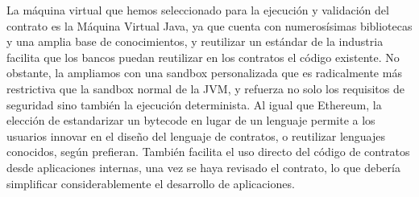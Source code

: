\documentclass{article}
\begin{document}
La máquina virtual que hemos seleccionado para la ejecución y validación del contrato es la Máquina Virtual Java\cite{JVM}, ya que cuenta con numerosísimas bibliotecas y una amplia base de conocimientos, y reutilizar un estándar de la industria facilita que los bancos puedan reutilizar en los contratos el código existente. No obstante, la ampliamos con una sandbox personalizada que es radicalmente más restrictiva que la sandbox normal de la JVM, y refuerza no solo los requisitos de seguridad sino también la ejecución determinista. Al igual que Ethereum\cite{Ethereum}, la elección de estandarizar un bytecode en lugar de un lenguaje permite a los usuarios innovar en el diseño del lenguaje de contratos, o reutilizar lenguajes conocidos, según prefieran. También facilita el uso directo del código de contratos desde aplicaciones internas, una vez se haya revisado el contrato, lo que debería simplificar considerablemente el desarrollo de aplicaciones.
\end{document}

